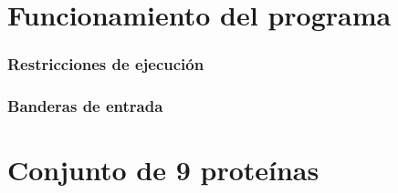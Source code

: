\chapter{Funcionamiento del programa}

\subsection*{Restricciones de ejecución}

\subsection*{Banderas de entrada}


\chapter{Conjunto de 9 proteínas}

